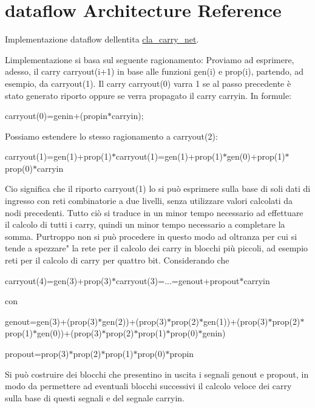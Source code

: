 \hypertarget{classcla__carry__net_1_1dataflow}{}\section{dataflow Architecture Reference}
\label{classcla__carry__net_1_1dataflow}


Implementazione dataflow dell\textquotesingle{}entita\textquotesingle{} \hyperlink{classcla__carry__net}{cla\+\_\+carry\+\_\+net}.

L\textquotesingle{}implementazione si basa sul seguente ragionamento\+: Proviamo ad esprimere, adesso, il carry carryout(i+1) in base alle funzioni gen(i) e prop(i), partendo, ad esempio, da carryout(1). Il carry carryout(0) varra\textquotesingle{} 1 se al passo precedente è stato generato riporto oppure se verra\textquotesingle{} propagato il carry carryin. In formule\+: \begin{center}carryout(0)=genin+(propin$\ast$carryin);\end{center}  Possiamo estendere lo stesso ragionamento a carryout(2)\+: \begin{center}carryout(1)=gen(1)+prop(1)$\ast$carryout(1)=gen(1)+prop(1)$\ast$gen(0)+prop(1)$\ast$prop(0)$\ast$carryin\end{center}  Cio\textquotesingle{} significa che il riporto carryout(1) lo si può esprimere sulla base di soli dati di ingresso con reti combinatorie a due livelli, senza utilizzare valori calcolati da nodi precedenti. Tutto ciò si traduce in un minor tempo necessario ad effettuare il calcolo di tutti i carry, quindi un minor tempo necessario a completare la somma. Purtroppo non si può procedere in questo modo ad oltranza per cui si tende a spezzare" la rete per il calcolo dei carry in blocchi più piccoli, ad esempio reti per il calcolo di carry per quattro bit. Considerando che \begin{center}carryout(4)=gen(3)+prop(3)$\ast$carryout(3)=...=genout+propout$\ast$carryin\end{center}  con \begin{center}genout=gen(3)+(prop(3)$\ast$gen(2))+(prop(3)$\ast$prop(2)$\ast$gen(1))+(prop(3)$\ast$prop(2)$\ast$prop(1)$\ast$gen(0))+(prop(3)$\ast$prop(2)$\ast$prop(1)$\ast$prop(0)$\ast$genin)\end{center}  \begin{center}propout=prop(3)$\ast$prop(2)$\ast$prop(1)$\ast$prop(0)$\ast$propin\end{center}  Si può costruire dei blocchi che presentino in uscita i segnali genout e propout, in modo da permettere ad eventuali blocchi successivi il calcolo veloce dei carry sulla base di questi segnali e del segnale carryin.  




